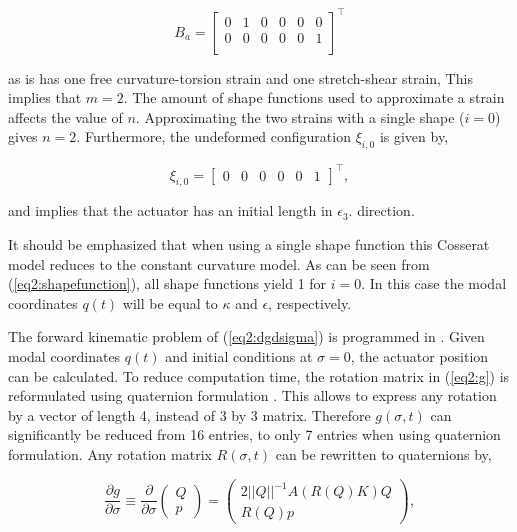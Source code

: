 \begin{equation}
    B_a = \begin{bmatrix}
    0 & 1 & 0 & 0 & 0 & 0 \\
    0 & 0 & 0 & 0 & 0 & 1 \\
    \end{bmatrix}^\top
\end{equation}

as is has one free curvature-torsion strain and one stretch-shear strain, This implies that $m = 2$. The amount of shape functions used to approximate a strain affects the value of $n$. Approximating the two strains with a single shape ($i=0$) gives $n = 2$. Furthermore, the undeformed configuration $\xi_{i,0}$ is given by,

\begin{equation}
    \xi_{i,0} = \begin{bmatrix}  0 & 0 & 0 & 0 & 0 & 1 \end{bmatrix}^\top, 
\end{equation}

and implies that the actuator has an initial length in $\epsilon_3$. direction.

It should be emphasized that when using a single shape function this Cosserat model reduces to the constant curvature model. As can be seen from (\ref{eq2:shapefunction}), all shape functions yield 1 for $i=0$. In this case the modal coordinates $q(t)$ will be equal to $\kappa$ and $\epsilon$, respectively. 

The forward kinematic problem of (\ref{eq2:dgdsigma}) is programmed in \MATLAB \cite{MATLAB2020}. Given modal coordinates $q(t)$ and initial conditions at $\sigma = 0$, the actuator position can be calculated. To reduce computation time, the rotation matrix in (\ref{eq2:g}) is reformulated using quaternion formulation \cite{Boyer2019}. This allows to express any rotation by a vector of length 4, instead of 3 by 3 matrix. Therefore $g(\sigma,t)$ can significantly be reduced from 16 entries, to only 7 entries when using quaternion formulation. Any rotation matrix $R(\sigma,t)$ can be rewritten to quaternions by,


\begin{equation}
\frac{\partial g}{\partial \sigma} \equiv \frac{\partial}{\partial \sigma}    \begin{pmatrix} Q \\ p \end{pmatrix} = \begin{pmatrix} 2 ||Q||^{-1} A(R(Q)K)Q \\ R(Q)p \end{pmatrix},
\label{eq2:Qp}
\end{equation}

